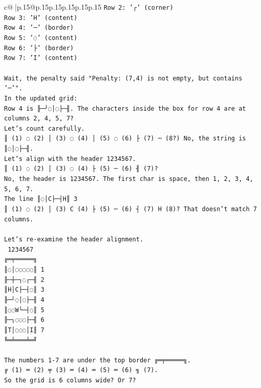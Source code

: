 \documentclass{article}
\begin{document}
{\begin{supertabular}{c@{$\;$}|p{.15\linewidth}@{}p{.15\linewidth}p{.15\linewidth}p{.15\linewidth}p{.15\linewidth}p{.15\linewidth}}
{{{\texttt{Row 2: '┌' (corner)} \\
\texttt{Row 3: 'H' (content)} \\
\texttt{Row 4: '─' (border)} \\
\texttt{Row 5: '◌' (content)} \\
\texttt{Row 6: '├' (border)} \\
\texttt{Row 7: 'I' (content)} \\
\\ 
\texttt{Wait, the penalty said "Penalty: (7,4) is not empty, but contains '─'".} \\
\texttt{In the updated grid:} \\
\texttt{Row 4 is ╟─┘◌│◌├─╢. The characters inside the box for row 4 are at columns 2, 4, 5, 7?} \\
\texttt{Let's count carefully.} \\
\texttt{║ (1) ◌ (2) │ (3) ◌ (4) │ (5) ◌ (6) ├ (7) ─ (8?) No, the string is ║◌│◌├─╢.} \\
\texttt{Let's align with the header  1234567.} \\
\texttt{║ (1) ◌ (2) │ (3) ◌ (4) ├ (5) ─ (6) ╢ (7)?} \\
\texttt{No, the header is  1234567. The first char is space, then 1, 2, 3, 4, 5, 6, 7.} \\
\texttt{The line ║◌│C├─┤H║ 3} \\
\texttt{║ (1) ◌ (2) │ (3) C (4) ├ (5) ─ (6) ┤ (7) H (8)? That doesn't match 7 columns.} \\
\\ 
\texttt{Let's re{-}examine the header alignment.} \\
\texttt{ 1234567} \\
\texttt{╔═╤═════╗} \\
\texttt{║◌│◌◌◌◌◌║ 1} \\
\texttt{╟─┼─┐◌┌─╢ 2} \\
\texttt{║H│C├─┤◌║ 3} \\
\texttt{╟─┘◌│◌├─╢ 4} \\
\texttt{║◌◌W└─┤◌║ 5} \\
\texttt{╟─┐◌◌◌├─╢ 6} \\
\texttt{║T│◌◌◌│I║ 7} \\
\texttt{╚═╧═══╧═╝} \\
\\ 
\texttt{The numbers 1{-}7 are under the top border ╔═╤═════╗.} \\
\texttt{╔ (1) ═ (2) ╤ (3) ═ (4) ═ (5) ═ (6) ╗ (7).} \\
\texttt{So the grid is 6 columns wide? Or 7?} \\
}}}
\end{supertabular}}
\end{document}
